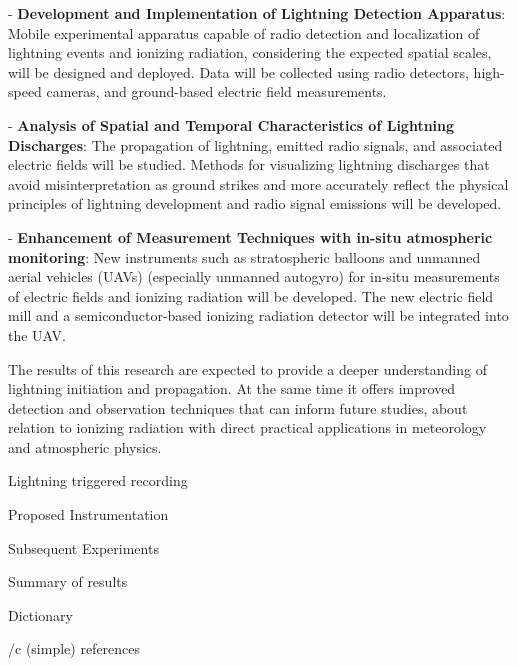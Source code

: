 \begitems
\item - {\bf Development and Implementation of Lightning Detection Apparatus}: Mobile experimental apparatus capable of radio detection and localization of lightning events and ionizing radiation, considering the expected spatial scales, will be designed and deployed. Data will be collected using radio detectors, high-speed cameras, and ground-based electric field measurements.
\item - {\bf Analysis of Spatial and Temporal Characteristics of Lightning Discharges}: The propagation of lightning, emitted radio signals, and associated electric fields will be studied. Methods for visualizing lightning discharges that avoid misinterpretation as ground strikes and more accurately reflect the physical principles of lightning development and radio signal emissions will be developed.
\item - {\bf Enhancement of Measurement Techniques with in-situ atmospheric monitoring}: New instruments such as stratospheric balloons and unmanned aerial vehicles (UAVs) (especially unmanned autogyro) for in-situ measurements of electric fields and ionizing radiation will be developed. The new electric field mill and a semiconductor-based ionizing radiation detector will be integrated into the UAV.
\enditems

The results of this research are expected to provide a deeper understanding of lightning initiation and propagation. At the same time it offers improved detection and observation techniques that can inform future studies, about relation to ionizing radiation with direct practical applications in meteorology and atmospheric physics.

 

\chap Lightning triggered recording 

 

\chap Proposed Instrumentation

 

\chap Subsequent Experiments

 

\chap Summary of results

 

\app Dictionary
\makeglos

\bibchap
\usebib/c (simple) references

\bye

